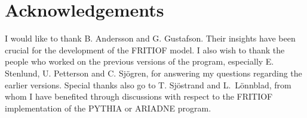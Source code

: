 \section{Acknowledgements}

I would like to thank B. Andersson and G. Gustafson.  
Their insights have been
crucial for the development of the FRITIOF model.
I also wish to thank the people who worked on the previous versions
of the program, especially E. Stenlund, U. Petterson and C. Sj\"ogren,
for answering my questions regarding the earlier versions.  
Special thanks also go to T. Sj\"ostrand and L.\ L\"onnblad,
from whom I have benefited through discussions with respect to 
the FRITIOF implementation of the PYTHIA or ARIADNE program.   


\appendix
\newpage
\renewcommand{\thesection}{Appendix \Alph{section}}
\renewcommand{\theequation}{\mbox{A}\arabic{equation}}
\setcounter{equation}{0}

